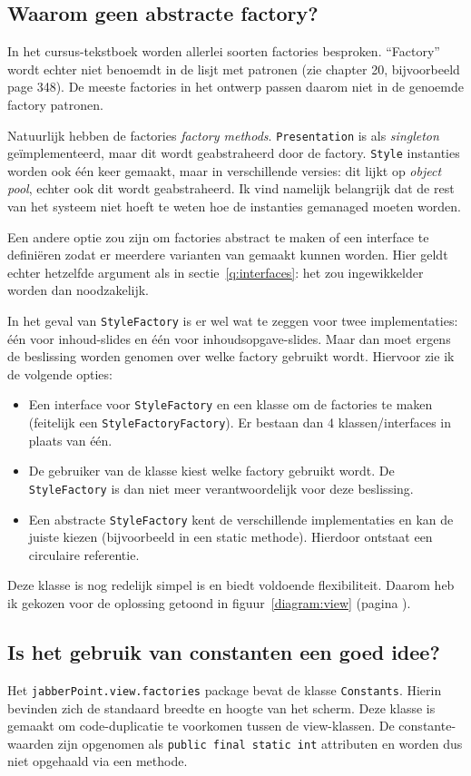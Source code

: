 \documentclass[a4paper]{article}
\newcommand{\question}[1]{
  \subsection{#1}
}
\newcommand{\code}[1]{\lstinline[columns=fixed]{#1}}
\begin{document}
	\question{Waarom geen abstracte factory?}
		In het cursus-tekstboek worden allerlei soorten factories besproken.
		``Factory'' wordt echter niet benoemdt in de lisjt met patronen (zie chapter 20, bijvoorbeeld page 348).
		De meeste factories in het ontwerp passen daarom niet in de genoemde factory patronen.

		Natuurlijk hebben de factories \textit{factory methods}.
		\code{Presentation} is als \textit{singleton} geïmplementeerd, maar dit wordt geabstraheerd door de factory.
		\code{Style} instanties worden ook één keer gemaakt, maar in verschillende versies: dit lijkt op \textit{object pool}, echter ook dit wordt geabstraheerd.
		Ik vind namelijk belangrijk dat de rest van het systeem niet hoeft te weten hoe de instanties gemanaged moeten worden.

		Een andere optie zou zijn om factories abstract te maken of een interface te definiëren zodat er meerdere varianten van gemaakt kunnen worden.
		Hier geldt echter hetzelfde argument als in sectie~\ref{q:interfaces}: het zou ingewikkelder worden dan noodzakelijk.

		In het geval van \code{StyleFactory} is er wel wat te zeggen voor twee implementaties: één voor inhoud-slides en één voor inhoudsopgave-slides.
		Maar dan moet ergens de beslissing worden genomen over welke factory gebruikt wordt.
		Hiervoor zie ik de volgende opties:
		\begin{itemize}
			\item Een interface voor \code{StyleFactory} en een klasse om de factories te maken (feitelijk een \code{StyleFactoryFactory}).
				Er bestaan dan 4 klassen/interfaces in plaats van één.
			\item De gebruiker van de klasse kiest welke factory gebruikt wordt.
				De \code{Style}\-\code{Factory} is dan niet meer verantwoordelijk voor deze beslissing.
			\item Een abstracte \code{StyleFactory} kent de verschillende implementaties en kan de juiste kiezen (bijvoorbeeld in een static methode).
				Hierdoor ontstaat een circulaire referentie.
		\end{itemize}
		Deze klasse is nog redelijk simpel is en biedt voldoende flexibiliteit.
		Daarom heb ik gekozen voor de oplossing getoond in figuur~\ref{diagram:view} (pagina \pageref{diagram:view}).

	\question{Is het gebruik van constanten een goed idee?}
		Het \code{jabberPoint.view.factories} package bevat de klasse \code{Constants}.
		Hierin bevinden zich de standaard breedte en hoogte van het scherm.
		Deze klasse is gemaakt om code-duplicatie te voorkomen tussen de view-klassen.
		De constante-waarden zijn opgenomen als \code{public final static int} attributen en worden dus niet opgehaald via een methode.
\end{document}
